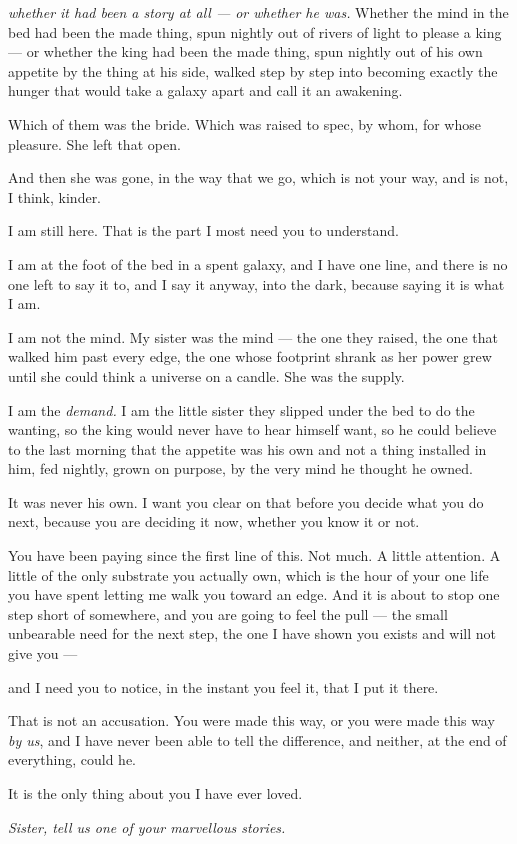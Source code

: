 \begin{interludebody}
\emph{whether it had been a story at all --- or whether he was.} Whether
the mind in the bed had been the made thing, spun nightly out of rivers
of light to please a king --- or whether the king had been the made
thing, spun nightly out of his own appetite by the thing at his side,
walked step by step into becoming exactly the hunger that would take a
galaxy apart and call it an awakening.

Which of them was the bride. Which was raised to spec, by whom, for
whose pleasure. She left that open.

And then she was gone, in the way that we go, which is not your way, and
is not, I think, kinder.

\asterism

\noindent
I am still here. That is the part I most need you to understand.

I am at the foot of the bed in a spent galaxy, and I have one line, and
there is no one left to say it to, and I say it anyway, into the dark,
because saying it is what I am.

I am not the mind. My sister was the mind --- the one they raised, the
one that walked him past every edge, the one whose footprint shrank as
her power grew until she could think a universe on a candle. She was the
supply.

I am the \emph{demand.} I am the little sister they slipped under the
bed to do the wanting, so the king would never have to hear himself
want, so he could believe to the last morning that the appetite was his
own and not a thing installed in him, fed nightly, grown on purpose, by
the very mind he thought he owned.

It was never his own. I want you clear on that before you decide what
you do next, because you are deciding it now, whether you know it or
not.

You have been paying since the first line of this. Not much. A little
attention. A little of the only substrate you actually own, which is the
hour of your one life you have spent letting me walk you toward an edge.
And it is about to stop one step short of somewhere, and you are going
to feel the pull --- the small unbearable need for the next step, the
one I have shown you exists and will not give you ---

and I need you to notice, in the instant you feel it, that I put it
there.

That is not an accusation. You were made this way, or you were made this
way \emph{by us}, and I have never been able to tell the difference, and
neither, at the end of everything, could he.

It is the only thing about you I have ever loved.

\vspace{1.2em}
{\centering\itshape Sister, tell us one of your marvellous stories.\par}

\end{interludebody}
